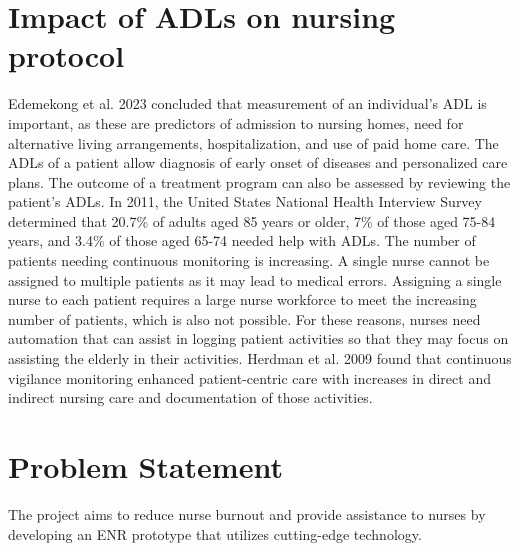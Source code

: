 \section{Impact of ADLs on nursing protocol}
Edemekong et al. 2023 \cite{ADLs-importance} concluded that measurement of an individual's ADL is important, as these are predictors of admission to nursing homes, need for alternative living arrangements, hospitalization, and use of paid home care. The ADLs of a patient allow diagnosis of early onset of diseases and personalized care plans. The outcome of a treatment program can also be assessed by reviewing the patient's ADLs. In 2011, the United States National Health Interview Survey determined that 20.7\% of adults aged 85 years or older, 7\% of those aged 75-84 years, and 3.4\% of those aged 65-74 needed help with ADLs. The number of patients needing continuous monitoring is increasing. A single nurse cannot be assigned to multiple patients as it may lead to medical errors. Assigning a single nurse to each patient requires a large nurse workforce to meet the increasing number of patients, which is also not possible. For these reasons, nurses need automation that can assist in logging patient activities so that they may focus on assisting the elderly in their activities.  Herdman et al. 2009 \cite{Herdman2009ImpactOC} found that continuous vigilance monitoring enhanced patient-centric care with increases in direct and indirect nursing care and documentation of those activities.
\section{Problem Statement}
The project aims to reduce nurse burnout and provide assistance to nurses by developing an ENR prototype that utilizes cutting-edge technology.
